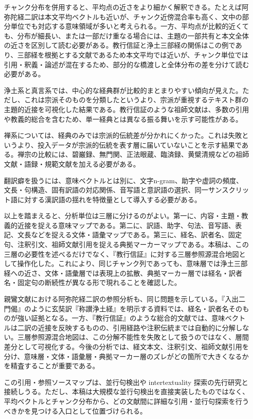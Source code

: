 \documentclass[uplatex,dvipdfmx,11pt,a4paper]{jsarticle}
\begin{document}
チャンク分布を併用すると、平均点の近さをより細かく解釈できる。たとえば阿弥陀経二訳は本文平均ベクトルも近いが、チャンク近傍混合率も高く、文中の部分単位でも対応する意味領域が多いと考えられる。一方、平均点が比較的近くても、分布が細長い、または一部だけ重なる場合には、主題の一部共有と本文全体の近さを区別して読む必要がある。教行信証と浄土三部経の関係はこの例であり、三部経を根拠とする文献であるため本文平均では近いが、チャンク単位では引用・釈義・論述が混在するため、部分的な橋渡しと全体分布の差を分けて読む必要がある。

浄土系と真言系では、中心的な経典群が比較的まとまりやすい傾向が見えた。ただし、これは宗派そのものを分類したというより、宗派が重視するテキスト群の主題的近接を可視化した結果である。教行信証のような祖師文献は、多数の引用や教義的総合を含むため、単一経典とは異なる振る舞いを示す可能性がある。

禅系については、経典のみでは宗派的伝統差が分かれにくかった。これは失敗というより、投入データが宗派的伝統を表す層に届いていないことを示す結果である。禅宗の比較には、碧巌録、無門関、正法眼蔵、臨済録、黄檗清規などの祖師文献・語録・規範文献を加える必要がある。

翻訳癖を扱うには、意味ベクトルとは別に、文字n-gram、助字や虚詞の頻度、文長・句構造、固有訳語の対応関係、音写語と意訳語の選択、同一サンスクリット語に対する漢訳語の揺れを特徴量として導入する必要がある。

以上を踏まえると、分析単位は三層に分けるのがよい。第一に、内容・主題・教義的近接を捉える意味マップである。第二に、訳語、助字、句法、音写語、表記、文長などを捉える文体・語彙マップである。第三に、経名、訳者名、固定句、注釈引文、祖師文献引用を捉える典拠マーカーマップである。本稿は、この三層の必要性を述べるだけでなく、『教行信証』に対する三層参照源混合地図として操作化した。これにより、同じチャンク列であっても、意味層では浄土三部経への近さ、文体・語彙層では表現上の拡散、典拠マーカー層では経名・訳者名・固定句の断続性が異なる形で現れることを確認した。

親鸞文献における阿弥陀経二訳の参照分析も、同じ問題を示している。『入出二門偈』のように玄奘訳『称讃浄土経』を明示する資料では、経名・訳者名そのものが強い証拠となる。一方、『教行信証』のような総合的文献では、意味ベクトルは二訳の近接を反映するものの、引用経路や注釈伝統までは自動的に分解しない。三層参照源混合地図は、この分解不能性を失敗として扱うのではなく、層間差分として可視化する。今後の分析では、経文本文、注釈引文、祖師文献引用を分け、意味層・文体・語彙層・典拠マーカー層のズレがどの箇所で大きくなるかを精査することが重要である。

この引用・参照ソースマップは、並行句検出や intertextuality 探索の先行研究\cite{nehrdich2020,dharmanexus}と接続しうる。ただし、本稿は大規模な並行句検出を直接実装したものではなく、平均ベクトルとチャンク分布から、どの文献間に詳細な引用・並行句探索を行うべきかを見つける入口として位置づけられる。
\end{document}
